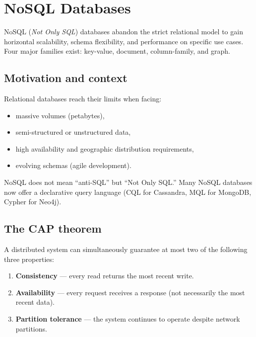 \chapter{NoSQL Databases}
\label{ch:nosql}

\begin{intuition}[title=\textbf{Central idea}]
NoSQL (\emph{Not Only SQL}) databases abandon the strict relational model
to gain horizontal scalability, schema flexibility, and performance on
specific use cases. Four major families exist: key-value, document,
column-family, and graph.
\end{intuition}

\section{Motivation and context}

Relational databases reach their limits when facing:
\begin{itemize}
  \item massive volumes (petabytes),
  \item semi-structured or unstructured data,
  \item high availability and geographic distribution requirements,
  \item evolving schemas (agile development).
\end{itemize}

\begin{remark}
NoSQL does not mean ``anti-SQL'' but ``Not Only SQL.'' Many NoSQL databases
now offer a declarative query language (CQL for Cassandra, MQL for MongoDB,
Cypher for Neo4j).
\end{remark}

\section{The CAP theorem}

\begin{theorem}
A distributed system can simultaneously guarantee at most two of the
following three properties:
\begin{enumerate}
  \item \textbf{Consistency} --- every read returns the most recent write.
  \item \textbf{Availability} --- every request receives a response (not
        necessarily the most recent data).
  \item \textbf{Partition tolerance} --- the system continues to operate
        despite network partitions.
\end{enumerate}
\end{theorem}

